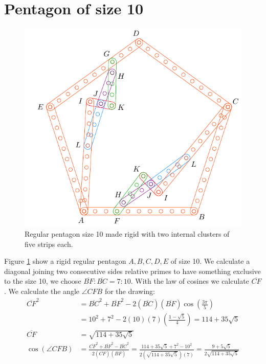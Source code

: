 \documentclass[11pt]{article}
\begin{document}
\section{Pentagon of size 10}

\begin{figure}[h]
 \centering
 \includegraphics[scale=1]{10/penta10a}
 \caption{Regular pentagon size 10 made rigid with two internal clusters of five strips each.}
 \label{fig:penta10a}
\end{figure}

Figure \ref{fig:penta10a} show a rigid regular pentagon $A,B,C,D,E$ of size 10. We calculate a diagonal joining two consecutive sides relative primes to have something exclusive to the size 10, we choose $\overline{BF}:\overline{BC} = 7:10$. With the law of cosines we calculate $\overline{CF}$.
We calculate the angle $\angle{CFB}$ for the drawing:
\begin{align}
\overline{CF}^2 &= \overline{BC}^2 + \overline{BF}^2
 - 2(\overline{BC})(\overline{BF})\cos\left(\frac{3\pi}5\right) \nonumber\\
 &= 10^2 + 7^2 - 2(10)(7)\left(\frac{1-\sqrt5}4\right) = 114 + 35\sqrt5 \nonumber\\
\overline{CF} &= \sqrt{114 + 35\sqrt5} \\
\cos(\angle{CFB}) &= \frac{\overline{CF}^2 + \overline{BF}^2 - \overline{BC}^2}
 {2(\overline{CF})(\overline{BF})}%
 = \frac{114+35\sqrt5 + 7^2 - 10^2}{2(\sqrt{114 + 35\sqrt5})(7)}
  = \frac{9+5\sqrt5}{2\sqrt{114+35\sqrt5}}
\end{align}
\end{document}
